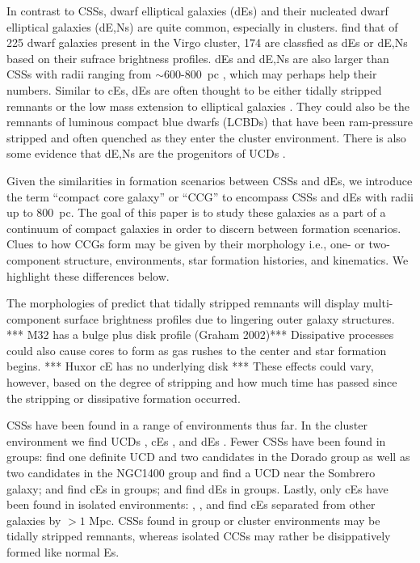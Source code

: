 \documentclass[iop,apj]{emulateapj}
\begin{document}
In contrast to CSSs, dwarf elliptical galaxies (dEs) and their nucleated dwarf elliptical galaxies (dE,Ns) are quite common, especially in clusters. \citet{Binggeli1991} find that of 225 dwarf galaxies present in the Virgo cluster, 174 are classfied as dEs or dE,Ns based on their sufrace brightness profiles. dEs and dE,Ns are also larger than CSSs with radii ranging from $\sim$600-800~pc \citep[e.g.,][]{Norris2014}, which may perhaps help their numbers. Similar to cEs, dEs are often thought to be either tidally stripped remnants \citep{Crnojevi2014} or the low mass extension to elliptical galaxies \citep{Crawford2016}. They could also be the remnants of luminous compact blue dwarfs (LCBDs) that have been ram-pressure stripped and often quenched as they enter the cluster environment. There is also some evidence that dE,Ns are the progenitors of UCDs \citep{Pfeffer2013,Zhang2015,Liu2015}.

Given the similarities in formation scenarios between CSSs and dEs, we introduce the term ``compact core galaxy'' or ``CCG'' to encompass CSSs and dEs with radii up to 800~pc. The goal of this paper is to study these galaxies as a part of a continuum of compact galaxies in order to discern between formation scenarios. Clues to how CCGs form may be given by their morphology i.e., one- or two-component structure, environments, star formation histories, and kinematics. We highlight these differences below.

The morphologies of \citet{Pfeffer2013} predict that tidally stripped remnants will display multi-component surface brightness profiles due to lingering outer galaxy structures. *** M32 has a bulge plus disk profile (Graham 2002)*** Dissipative processes could also cause cores to form as gas rushes to the center and star formation begins. *** Huxor cE has no underlying disk *** These effects could vary, however, based on the degree of stripping and how much time has passed since the stripping or dissipative formation occurred.

CSSs have been found in a range of environments thus far. In the cluster environment we find UCDs \citep{Price2009,Madrid2010,Hasegan2005,Jones2006,Mieske2009,Wehner2007,Misgeld2008}, cEs \citep{Chilingarian2007,SmithCastelli2012,Price2009}, and dEs \citep{SmithCastelli2012,Koo1994,Guzman1996,Crawford2016}. Fewer CSSs have been found in groups: \citet{Evstigneeva2007} find one definite UCD and two candidates in the Dorado group as well as two candidates in the NGC1400 group and \citet{Hau2009} find a UCD near the Sombrero galaxy; \citet{Huxor2011} and \citet{Chilingarian2010} find cEs in groups; and \citet{Crnojevi2014}  \citet{Penny2014} find dEs in groups. Lastly, only cEs have been found in isolated environments: \citet{Huxor2013}, \citet{Paudel2014}, and \citet{Chilingarian2015} find cEs separated from other galaxies by $>1$ Mpc. CSSs found in group or cluster environments may be tidally stripped remnants, whereas isolated CCSs may rather be disippatively formed like normal Es.
\end{document}
